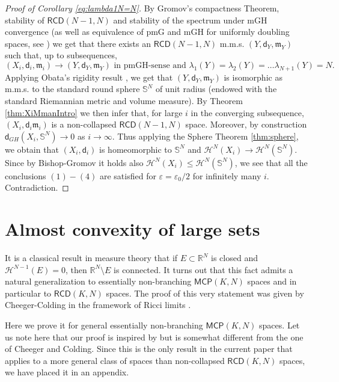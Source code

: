 \documentclass[a4paper]{amsart}
\theoremstyle{plain}
\theoremstyle{definition}
\numberwithin{equation}{section}
\newcommand{\R}{\mathbb{R}}
\newcommand{\RCD}{\mathsf{RCD}}
\newcommand{\MCP}{\mathsf{MCP}}
\newcommand{\mm}{\mathfrak m}
\newcommand{\sfd}{\mathsf d}
\newcommand{\cH}{\mathcal{H}}
\begin{document}
{{\begin{proof}[Proof of Corollary \ref{eq:lambda1N=N}]
 By Gromov's compactness Theorem, stability of $\RCD(N-1,N)$ and stability of the spectrum  \cite[Theorem 7.8]{GMS2013} under mGH convergence (as well as equivalence of pmG and mGH for uniformly doubling spaces, see \cite[Theorem 3.30 and Theorem  3.33]{GMS2013})  we get that  there exists an $\RCD(N-1,N)$ m.m.s. $(Y,\sfd_{Y},\mm_{Y})$ such that,  up to subsequences,  
 $$(X_{i},\sfd_{i},\mm_{i})\to (Y,\sfd_{Y},\mm_{Y}) \text{ in pmGH-sense and $\lambda_{1}(Y)=\lambda_{2}(Y)=\ldots \lambda_{N+1}(Y)=N$}. $$
 Applying   Obata's  rigidity result \cite[Theorem 1.4]{ketterer3}, we get that  $(Y,\sfd_{Y},\mm_{Y})$ is isomorphic as m.m.s. to the standard round sphere   ${\mathbb S}^{N}$ of unit radius (endowed with the standard Riemannian metric and volume measure). By Theorem \ref {thm:XiMmanIntro}  we then infer that, for large $i$ in the converging subsequence, $(X_{i},\sfd_{i}\mm_{i})$ is a non-collapsed $\RCD(N-1,N)$ space.
Moreover, by construction $\sfd_{GH} (X_{i},{\mathbb S}^{N}) \to 0$ as $i\to \infty$. Thus applying the Sphere Theorem \ref{thm:sphere}, we obtain that $(X_{i},\sfd_{i})$ is homeomorphic to ${\mathbb S}^{N}$ and $\cH^{N}(X_{i})\to  \cH^{N}(\mathbb S^{N})$. Since by Bishop-Gromov it holds also $\cH^{N}(X_{i})\leq \cH^{N}(\mathbb S^{N})$, we see that all the conclusions $(1)-(4)$ are satisfied for $\varepsilon=\varepsilon_{0}/2$ for infinitely many $i$. Contradiction.
\end{proof}

}
\appendix

\section{Almost convexity of large sets}

It is a classical result in measure theory that if $E\subset \R^{N}$ is closed and $\cH^{N-1}(E)=0$, then $\R^{N}\setminus E$ is connected. It turns out that this fact admits a natural generalization to { essentially non-branching $\MCP(K,N)$ spaces and in particular to}  $\RCD(K,N)$ spaces. The proof of this very statement was  given by Cheeger-Colding in the framework of Ricci limits \cite[Theorem 3.9]{CC00a}.

Here we prove it for general {essentially non-branching $\MCP(K,N)$ spaces}. Let us note here that our proof is inspired by but is somewhat different from the one of Cheeger and Colding.
Since this is the only result in the current paper that applies to a more general class of spaces than non-collapsed $\RCD(K,N)$ spaces,
we have placed it in an appendix.
{
}}
\end{document}
